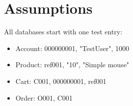 
\section{Assumptions}

All databases start with one test entry:

\begin{itemize}
\item Account: 000000001, "TestUser", 1000
\item Product: ref001, "10", "Simple mouse"
\item Cart: C001, 000000001, ref001
\item Order: O001, C001
\end{itemize}
